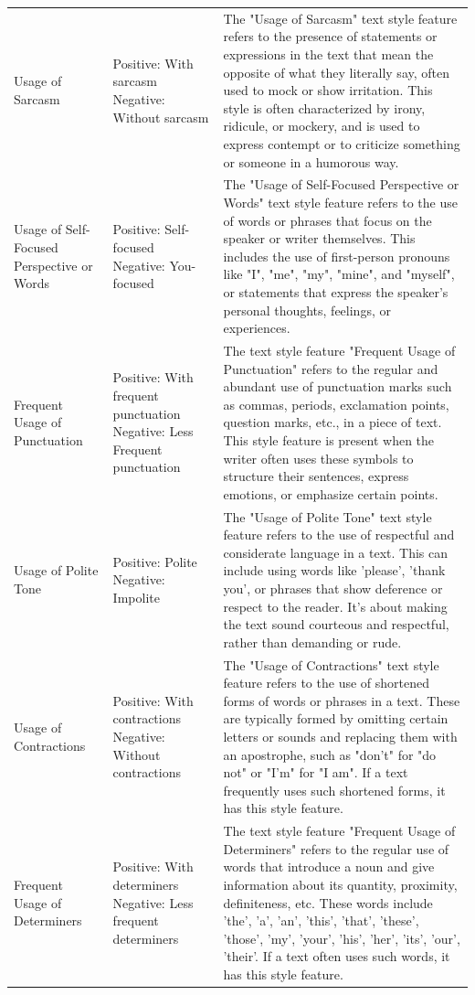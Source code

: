 {{\begin{longtable}{p{4cm} p{4cm} p{6.5cm}}
Usage of Sarcasm & Positive: With sarcasm \newline Negative: Without sarcasm & The "Usage of Sarcasm" text style feature refers to the presence of statements or expressions in the text that mean the opposite of what they literally say, often used to mock or show irritation. This style is often characterized by irony, ridicule, or mockery, and is used to express contempt or to criticize something or someone in a humorous way. \\
Usage of Self-Focused Perspective or Words & Positive: Self-focused \newline Negative: You-focused & The "Usage of Self-Focused Perspective or Words" text style feature refers to the use of words or phrases that focus on the speaker or writer themselves. This includes the use of first-person pronouns like "I", "me", "my", "mine", and "myself", or statements that express the speaker's personal thoughts, feelings, or experiences. \\
Frequent Usage of Punctuation & Positive: With frequent punctuation \newline Negative: Less Frequent punctuation & The text style feature "Frequent Usage of Punctuation" refers to the regular and abundant use of punctuation marks such as commas, periods, exclamation points, question marks, etc., in a piece of text. This style feature is present when the writer often uses these symbols to structure their sentences, express emotions, or emphasize certain points. \\
Usage of Polite Tone & Positive: Polite \newline Negative: Impolite & The "Usage of Polite Tone" text style feature refers to the use of respectful and considerate language in a text. This can include using words like 'please', 'thank you', or phrases that show deference or respect to the reader. It's about making the text sound courteous and respectful, rather than demanding or rude. \\
Usage of Contractions & Positive: With contractions \newline Negative: Without contractions & The "Usage of Contractions" text style feature refers to the use of shortened forms of words or phrases in a text. These are typically formed by omitting certain letters or sounds and replacing them with an apostrophe, such as "don't" for "do not" or "I'm" for "I am". If a text frequently uses such shortened forms, it has this style feature. \\
Frequent Usage of Determiners & Positive: With determiners \newline Negative: Less frequent determiners & The text style feature "Frequent Usage of Determiners" refers to the regular use of words that introduce a noun and give information about its quantity, proximity, definiteness, etc. These words include 'the', 'a', 'an', 'this', 'that', 'these', 'those', 'my', 'your', 'his', 'her', 'its', 'our', 'their'. If a text often uses such words, it has this style feature. \\

    
    \end{longtable}
    }
}